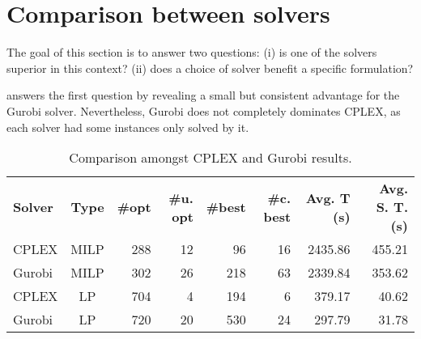 \section{Comparison between solvers}
\label{sec:results_comparing_solvers}

The goal of this section is to answer two questions:
(i) is one of the solvers superior in this context?
(ii) does a choice of solver benefit a specific formulation?

 answers the first question by revealing a small but consistent advantage for the Gurobi solver.
Nevertheless, Gurobi does not completely dominates CPLEX, as each solver had some instances only solved by it.

\begin{table}[h]
  \center
  \caption{Comparison amongst CPLEX and Gurobi results.}
  \setlength{}
  \begin{tabular}{lcrrrrrr}
    \hline\hline
    \textbf{Solver} & \textbf{Type} & \textbf{\#opt} & \textbf{\#u. opt} & \textbf{\#best} & \textbf{\#c. best} & \textbf{Avg. T (s)} & \textbf{Avg. S. T. (s)} \\\cmidrule(lr){1-2}\cmidrule(lr){3-8}
     CPLEX & MILP & 288 & 12 &  96 & 16 & 2435.86 & 455.21 \\
    Gurobi & MILP & 302 & 26 & 218 & 63 & 2339.84 & 353.62 \\
     CPLEX & LP  & 704 &  4 & 194 &  6 &  379.17 &  40.62 \\
    Gurobi & LP  & 720 & 20 & 530 & 24 &  297.79 &  31.78 \\\hline\hline
  \end{tabular}
  \label{tab:cplex_vs_gurobi}
\end{table}

